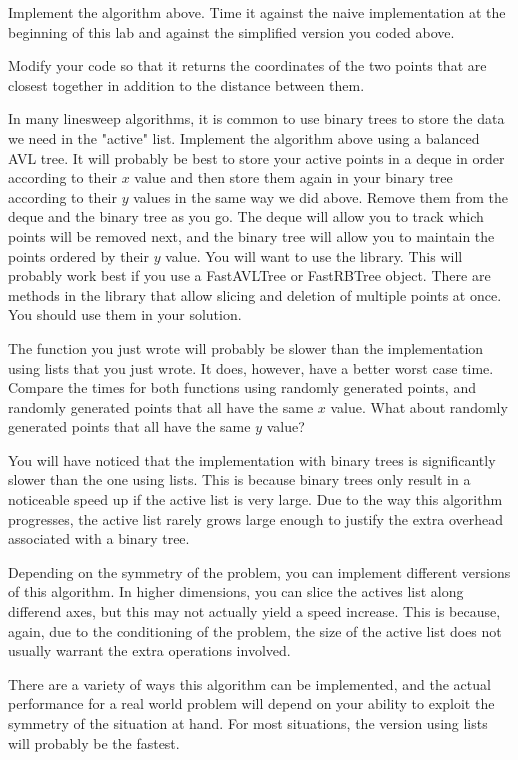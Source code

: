 \begin{problem}
Implement the algorithm above. Time it against the naive implementation at the beginning of this lab and against the simplified version you coded above.
\end{problem}

\begin{problem}
Modify your code so that it returns the coordinates of the two points that are closest together in addition to the distance between them.
\end{problem}

\begin{problem}
In many linesweep algorithms, it is common to use binary trees to store the data we need in the "active" list. Implement the algorithm above using a balanced AVL tree. It will probably be best to store your active points in a deque in order according to their $x$ value and then store them again in your binary tree according to their $y$ values in the same way we did above. Remove them from the deque and the binary tree as you go. The deque will allow you to track which points will be removed next, and the binary tree will allow you to maintain the points ordered by their $y$ value. You will want to use the  library. This will probably work best if you use a FastAVLTree or FastRBTree object. There are methods in the  library that allow slicing and deletion of multiple points at once. You should use them in your solution.
\end{problem}

\begin{problem}
The function you just wrote will probably be slower than the implementation using lists that you just wrote. It does, however, have a better worst case time. Compare the times for both functions using randomly generated points, and randomly generated points that all have the same $x$ value. What about randomly generated points that all have the same $y$ value?
\end{problem}

You will have noticed that the implementation with binary trees is significantly slower than the one using lists. This is because binary trees only result in a noticeable speed up if the active list is very large. Due to the way this algorithm progresses, the active list rarely grows large enough to justify the extra overhead associated with a binary tree.

Depending on the symmetry of the problem, you can implement different versions of this algorithm. In higher dimensions, you can slice the actives list along differend axes, but this may not actually yield a speed increase. This is because, again, due to the conditioning of the problem, the size of the active list does not usually warrant the extra operations involved. 

There are a variety of ways this algorithm can be implemented, and the actual performance for a real world problem will depend on your ability to exploit the symmetry of the situation at hand. For most situations, the version using lists will probably be the fastest. 
